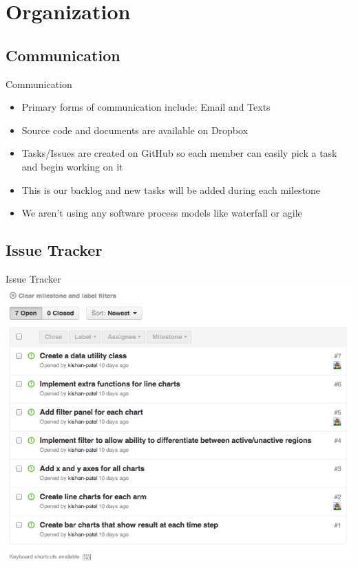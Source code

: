 \documentclass{beamer}
\begin{document}
\section{Organization}

\subsection{Communication}
\begin{frame}{Communication}
\begin{itemize}
\item Primary forms of communication include: Email and Texts
\item Source code and documents are available on Dropbox
\item Tasks/Issues are created on GitHub so each member can easily pick a task and begin working on it
\item This is our backlog and new tasks will be added during each milestone
\item We aren't using any software process models like waterfall or agile
\end{itemize}
\end{frame}

\subsection{Issue Tracker}
\begin{frame}{Issue Tracker}
\includegraphics[scale=0.25]{gitissues.png}
\end{frame}
\end{document}
